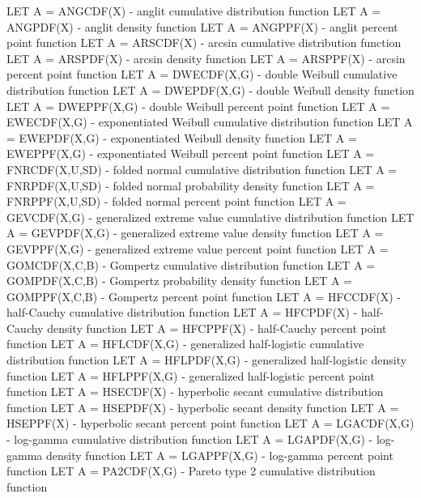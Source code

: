 {      LET A = ANGCDF(X)  - anglit cumulative distribution function
      LET A = ANGPDF(X)  - anglit density function
      LET A = ANGPPF(X)  - anglit percent point function
      LET A = ARSCDF(X)  - arcsin cumulative distribution function
      LET A = ARSPDF(X)  - arcsin density function
      LET A = ARSPPF(X)  - arcsin percent point function
      LET A = DWECDF(X,G) - double Weibull cumulative distribution
                            function
      LET A = DWEPDF(X,G) - double Weibull density function
      LET A = DWEPPF(X,G) - double Weibull percent point function
      LET A = EWECDF(X,G) - exponentiated Weibull cumulative
                            distribution function
      LET A = EWEPDF(X,G) - exponentiated Weibull density function
      LET A = EWEPPF(X,G) - exponentiated Weibull percent point function
      LET A = FNRCDF(X,U,SD) - folded normal cumulative distribution
                               function
      LET A = FNRPDF(X,U,SD) - folded normal probability density
                               function
      LET A = FNRPPF(X,U,SD) - folded normal percent point function
      LET A = GEVCDF(X,G) - generalized extreme value cumulative
                            distribution function
      LET A = GEVPDF(X,G) - generalized extreme value density function
      LET A = GEVPPF(X,G) - generalized extreme value percent point
                            function
      LET A = GOMCDF(X,C,B) - Gompertz cumulative distribution function
      LET A = GOMPDF(X,C,B) - Gompertz probability density function
      LET A = GOMPPF(X,C,B) - Gompertz percent point function
      LET A = HFCCDF(X)   - half-Cauchy cumulative distribution function
      LET A = HFCPDF(X)   - half-Cauchy density function
      LET A = HFCPPF(X)   - half-Cauchy percent point function
      LET A = HFLCDF(X,G) - generalized half-logistic cumulative
                            distribution function
      LET A = HFLPDF(X,G) - generalized half-logistic density function
      LET A = HFLPPF(X,G) - generalized half-logistic percent point
                            function
      LET A = HSECDF(X)   - hyperbolic secant cumulative distribution
                            function
      LET A = HSEPDF(X)   - hyperbolic secant density function
      LET A = HSEPPF(X)   - hyperbolic secant percent point function
      LET A = LGACDF(X,G) - log-gamma cumulative distribution function
      LET A = LGAPDF(X,G) - log-gamma density function
      LET A = LGAPPF(X,G) - log-gamma percent point function
      LET A = PA2CDF(X,G) - Pareto type 2 cumulative distribution
                            function
}
